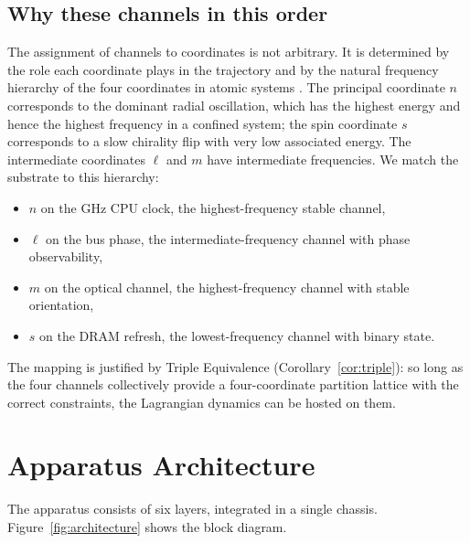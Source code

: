 \documentclass[twocolumn,11pt,a4paper]{article}
\theoremstyle{definition}
\theoremstyle{remark}
\begin{document}
\subsection{Why these channels in this order}

The assignment of channels to coordinates is not arbitrary. It is determined by the role each coordinate plays in the trajectory and by the natural frequency hierarchy of the four coordinates in atomic systems \citep{bohr1913,landau1977}. The principal coordinate $n$ corresponds to the dominant radial oscillation, which has the highest energy and hence the highest frequency in a confined system; the spin coordinate $s$ corresponds to a slow chirality flip with very low associated energy. The intermediate coordinates $\ell$ and $m$ have intermediate frequencies. We match the substrate to this hierarchy:

\begin{itemize}[nosep]
    \item $n$ on the GHz CPU clock, the highest-frequency stable channel,
    \item $\ell$ on the bus phase, the intermediate-frequency channel with phase observability,
    \item $m$ on the optical channel, the highest-frequency channel with stable orientation,
    \item $s$ on the DRAM refresh, the lowest-frequency channel with binary state.
\end{itemize}

The mapping is justified by Triple Equivalence (Corollary~\ref{cor:triple}): so long as the four channels collectively provide a four-coordinate partition lattice with the correct constraints, the Lagrangian dynamics can be hosted on them.

\section{Apparatus Architecture}
\label{sec:architecture}

The apparatus consists of six layers, integrated in a single chassis. Figure~\ref{fig:architecture} shows the block diagram.
\end{document}
